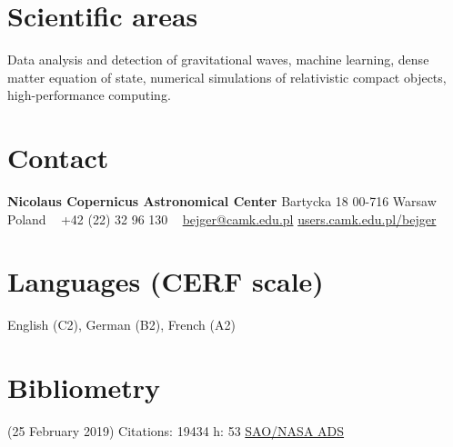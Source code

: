 \documentclass[]{friggeri-cv} %
\begin{document}


\begin{aside} %
\section{Scientific areas} 
Data analysis and detection of gravitational waves, machine learning, dense matter equation of state, numerical simulations of relativistic compact objects, high-performance computing.   
~
\section{Contact}
{\bf Nicolaus Copernicus Astronomical Center} 
Bartycka 18
00-716 Warsaw 
Poland
~
+42 (22) 32 96 130
~
\href{mailto:bejger@camk.edu.pl}{bejger@camk.edu.pl}
\href{http://users.camk.edu.pl/bejger}{users.camk.edu.pl/bejger}
~
\section{Languages {\small (CERF scale)}}
English (C2), German (B2), French (A2)
\section{Bibliometry} 
{\small (25 February 2019)}
Citations: 19434
h: 53
\href{http://adsabs.harvard.edu/cgi-bin/nph-abs_connect?db_key=AST&db_key=PHY&db_key=PRE&qform=AST&arxiv_sel=astro-ph&arxiv_sel=cond-mat&arxiv_sel=cs&arxiv_sel=gr-qc&arxiv_sel=hep-ex&arxiv_sel=hep-lat&arxiv_sel=hep-ph&arxiv_sel=hep-th&arxiv_sel=math&arxiv_sel=math-ph&arxiv_sel=nlin&arxiv_sel=nucl-ex&arxiv_sel=nucl-th&arxiv_sel=physics&arxiv_sel=quant-ph&arxiv_sel=q-bio&sim_query=YES&ned_query=YES&adsobj_query=YES&aut_logic=OR&obj_logic=OR&author=bejger\%2C+m.&object=&start_mon=&start_year=&end_mon=&end_year=&ttl_logic=OR&title=&txt_logic=OR&text=&nr_to_return=200&start_nr=1&jou_pick=ALL&ref_stems=&data_and=ALL&group_and=ALL&start_entry_day=&start_entry_mon=&start_entry_year=&end_entry_day=&end_entry_mon=&end_entry_year=&min_score=&sort=SCORE&data_type=SHORT&aut_syn=YES&ttl_syn=YES&txt_syn=YES&aut_wt=1.0&obj_wt=1.0&ttl_wt=0.3&txt_wt=3.0&aut_wgt=YES&obj_wgt=YES&ttl_wgt=YES&txt_wgt=YES&ttl_sco=YES&txt_sco=YES&version=1}{SAO/NASA ADS}
\end{aside}
\end{document}
